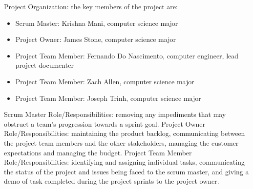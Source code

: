 
Project Organization: the key members of the project are:
\begin{itemize}

\item Scrum Master: Krishna Mani, computer science major

\item Project Owner: James Stone, computer science major 

\item Project Team Member: Fernando Do Nascimento, computer engineer, lead project documenter

\item Project Team Member: Zach Allen, computer science major

\item Project Team Member: Joseph Trinh, computer science major
\end{itemize}
\large Scrum Master Role/Responsibilities: removing any impediments that may obstruct a team’s progression towards a sprint goal.
\large Project Owner Role/Responsibilities: maintaining the product backlog, communicating between the project team members and the other stakeholders, managing the customer expectations and managing the budget.
\large Project Team Member Role/Responsibilities: identifying and assigning individual tasks, communicating the status of the project and issues being faced to the scrum master, and giving a demo of task completed during the project sprints to the project owner.